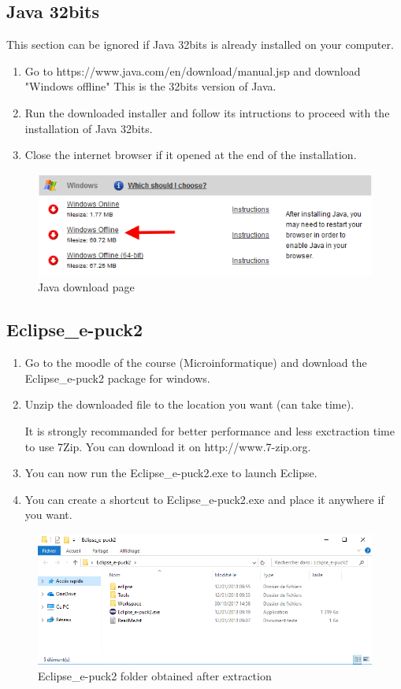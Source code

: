 \documentclass[a4paper]{article}
\begin{document}
\subsection{Java 32bits}
This section can be ignored if Java 32bits is already installed on your computer.

\begin{enumerate}
\item Go to https://www.java.com/en/download/manual.jsp and download "Windows offline" This is the 32bits version of Java.
\item Run the downloaded installer and follow its intructions to proceed with the installation of Java 32bits.
\item Close the internet browser if it opened at the end of the installation.
\end{enumerate}

\begin{figure}[!h]
\centering
\includegraphics[width=0.5\columnwidth]{fig/Java_Windows}
\caption{Java download page}
\label{fig:Java_windows}
\end{figure}


\subsection{Eclipse\_e-puck2}

\begin{enumerate}
\item Go to the moodle of the course (Microinformatique) and download the Eclipse\_e-puck2 package for windows.
\item Unzip the downloaded file to the location you want (can take time). 

It is strongly recommanded for better performance and less exctraction time to use 7Zip. You can download it on http://www.7-zip.org.
\item You can now run the Eclipse\_e-puck2.exe to launch Eclipse.
\item You can create a shortcut to Eclipse\_e-puck2.exe and place it anywhere if you want.
\end{enumerate}

\begin{figure}[!h]
\centering
\includegraphics[width=1\columnwidth]{fig/Eclipse_e-puck2_Folder_Windows}
\caption{Eclipse\_e-puck2 folder obtained after extraction}
\label{fig:Eclipse_e-puck2_Folder_Windows}
\end{figure}
\end{document}
